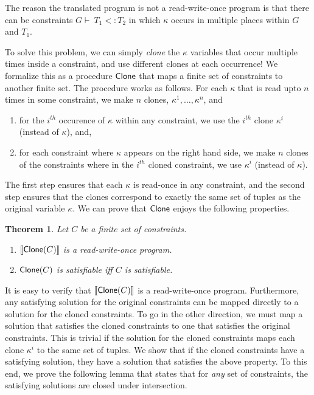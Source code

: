 \documentclass[nocopyrightspace]{sigplanconf}
\makeatletter
\newtheorem{@protheo}{Theorem}
\newenvironment{theorem}[1]{\begin{@protheo}{\rm \bf #1}\it}{\end{@protheo}}
\def\subt{<:}
\newcommand{\kvar}{\kappa}
\newcommand{\renv}{G}
\newcommand{\tliqs}{T}
\newcommand{\deriv}{\vdash\ }
\def\CLONE{{\sf Clone}}
\makeatother
\begin{document}
The reason the translated program is not a read-write-once program is that 
there can be constraints $\renv \deriv \tliqs_1 \subt \tliqs_2$ 
in which $\kvar$ occurs in multiple places within $\renv$ and $\tliqs_1$.

To solve this problem, we can simply \emph{clone} the $\kvar$ variables 
that occur multiple times inside a constraint, and use different clones 
at each occurrence!
We formalize this as a procedure $\CLONE$ that maps a finite set of 
constraints to another finite set. The procedure works as follows. 
For each $\kvar$ that is read upto $n$ times in some constraint, we 
make $n$ clones, $\kvar^1,\ldots,\kvar^n$, and 
\begin{enumerate}
\item for the $i^{th}$ occurence of $\kvar$ within any constraint, 
    we use the $i^{th}$ clone $\kvar^i$ (instead of $\kvar$), and,
\item for each constraint where $\kvar$ appears on the right hand side, 
    we make $n$ clones of the constraints where in the $i^{th}$ cloned constraint, 
    we use $\kvar^i$ (instead of $\kvar$). 
\end{enumerate}
The first step ensures that each $\kvar$ is read-once in any constraint, and
the second step ensures that the clones correspond to exactly the same set of tuples 
as the original variable $\kvar$.
We can prove that $\CLONE$ enjoys the following properties.

\begin{theorem}{}\label{th:clone}
Let $C$ be a finite set of constraints.
\begin{enumerate}
\item $\translate{\CLONE(C)}$ is a read-write-once program.
\item $\CLONE(C)$ is satisfiable iff $C$ is satisfiable.
\end{enumerate}
\end{theorem}

It is easy to verify that $\translate{\CLONE(C)}$ is a read-write-once
program. 
Furthermore, any satisfying solution for the original
constraints can be mapped directly to a solution for 
the cloned constraints. 
To go in the other direction, we must map a solution that satisfies the
cloned constraints to one that satisfies the original constraints.
This is trivial if the solution for the cloned constraints 
maps each clone $\kvar^i$ to the same set of tuples.
We show that if the cloned constraints have a satisfying solution,
they have a solution that satisfies the above property.
To this end, we prove the following lemma that states 
that for \emph{any} set of constraints, the satisfying 
solutions are closed under intersection.
\end{document}

